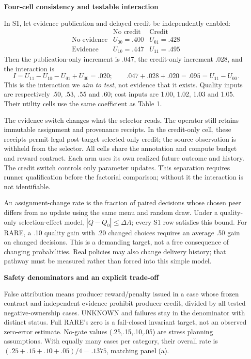 \documentclass[10pt,a4paper]{article}
\newcommand{\lead}[1]{\vspace{4pt}\textbf{#1}\par}
\begin{document}
\lead{Four-cell consistency and testable interaction}
In S1, let evidence publication and delayed credit be independently enabled:
\[
\begin{array}{c|cc}
 & \text{No credit} & \text{Credit}\\\hline
\text{No evidence} & U_{00}=.400 & U_{01}=.428\\
\text{Evidence} & U_{10}=.447 & U_{11}=.495
\end{array}
\]
Then the publication-only increment is .047, the credit-only increment .028,
and the interaction is
\[
 I=U_{11}-U_{10}-U_{01}+U_{00}=.020;
 \qquad .047+.028+.020=.095=U_{11}-U_{00}.
\]
This is the interaction we \emph{aim to test}, not evidence that it exists.
Quality inputs are respectively .50, .53, .55 and .60; cost inputs are 1.00,
1.02, 1.03 and 1.05. Their utility cells use the same coefficient as Table 1.

The evidence switch changes what the selector reads. The operator still retains
immutable assignment and provenance receipts. In the credit-only cell, these
receipts permit legal post-target selected-only credit; the source observation
is withheld from the selector. All cells share the annotation and compute budget
and reward contract. Each arm uses its own realized future outcome and history.
The credit switch controls only parameter updates.
This separation requires runner qualification before the factorial comparison;
without it the interaction is not identifiable.

An assignment-change rate is the fraction of paired decisions whose chosen peer
differs from no update using the same menu and random draw. Under a quality-only
selection-effect model, $|Q-Q_0|\leq\Delta A$; every S1 row satisfies this bound.
For RARE, a .10 quality gain with .20 changed choices requires an average .50
gain on changed decisions. This is a demanding target, not a free consequence
of changing probabilities. Real policies may also change delivery history;
that pathway must be measured rather than forced into this simple model.

\lead{Safety denominators and an explicit trade-off}
False attribution means producer reward/penalty issued in a case whose frozen
contract and independent evidence prohibit producer credit, divided by all
tested negative-ownership cases. UNKNOWN and failures stay in the denominator
with distinct status. Full RARE's zero is a fail-closed invariant target, not
an observed zero-error estimate. No-gate values (.25,.15,.10,.05) are stress
planning assumptions. With equally many cases per category, their overall rate
is $(.25+.15+.10+.05)/4=.1375$, matching panel (a).
\end{document}
